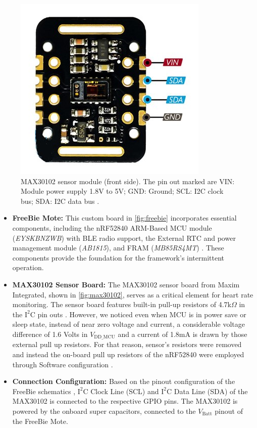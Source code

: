\begin{figure}[t]
    \centering
    \includegraphics[width=0.4\linewidth]{chapters/Implementation/MAX30102.jpg}
    \caption{MAX30102 sensor module (front side). The pin out marked are VIN: Module power supply 1.8V to 5V; GND: Ground; SCL: I2C clock bus; SDA: I2C data bus \cite{max30102pinout}.}
    \label{fig:max30102}
\end{figure}

\begin{itemize}
    \item \textbf{FreeBie Mote:} This custom board in \autoref{fig:freebie} incorporates essential components, including the nRF52840 ARM-Based MCU module (\textit{EYSKBNZWB}) with BLE radio support, the External RTC and power management module (\textit{AB1815}), and FRAM (\textit{MB85RS4MT}) \cite{de2022Intermittently}. These components provide the foundation for the framework's intermittent operation.
    
    \item \textbf{MAX30102 Sensor Board:} The MAX30102 sensor board from Maxim Integrated, shown in \autoref{fig:max30102}, serves as a critical element for heart rate monitoring. The sensor board features built-in pull-up resistors of 4.7k\(\Omega\) in the \(\text{I}^2\text{C}\) pin outs \cite{2018MAX30102}. However, we noticed even when MCU is in power save or sleep state, instead of near zero voltage and current, a considerable voltage difference of 1.6 Volts in $V_{\text{DD\_MCU}}$ and a current of 1.8mA is drawn by those external pull up resistors. For that reason, sensor's resistors were removed and instead the on-board pull up resistors of the nRF52840 were employed through Software configuration \cite{2021nrf52840pullup}.
    
    \item \textbf{Connection Configuration:} Based on the pinout configuration of the FreeBie schematics \cite{FreeBieGithub},  \(\text{I}^2\text{C}\) Clock Line (SCL) and \(\text{I}^2\text{C}\) Data Line (SDA) of the MAX30102 is connected to the respective GPIO pins. The MAX30102 is powered by the onboard super capacitors, connected to the $V_{\text{Batt}}$ pinout of the FreeBie Mote.
\end{itemize}

